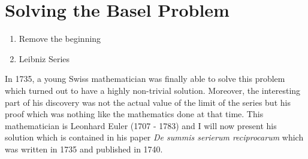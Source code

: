 \section{Solving the Basel Problem}

\td 

\begin{enumerate}
    \item Remove the beginning
    \item Leibniz Series
\end{enumerate}

\td 

In 1735, a young Swiss mathematician was finally able to solve this problem which turned out to have a highly non-trivial solution. Moreover, the interesting part of his discovery was not the actual value of the limit of the series but his proof which was nothing like the mathematics done at that time. This mathematician is Leonhard Euler (1707 - 1783) and I will now present his solution which is contained in his paper \textit{De summis serierum reciprocarum} \cite{eulerBaselProblem} which was written in 1735 and published in 1740.

